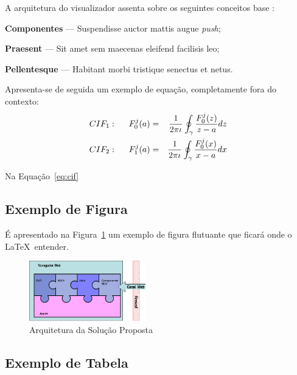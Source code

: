 \documentclass[twocolumn,twoside,11pt]{article}
\begin{document}
A arquitetura do visualizador assenta sobre os seguintes conceitos base \cite{kn:zpmd}:
\begin{compactitem}
\item \textbf{Componentes} --- Suspendisse auctor mattis augue \emph{push};
\item \textbf{Praesent} --- Sit amet sem maecenas eleifend facilisis leo;
\item \textbf{Pellentesque} --- Habitant morbi tristique senectus et netus.
\end{compactitem}

\lipsum[4]

Apresenta-se de seguida um exemplo de equação, completamente fora do contexto:
\begin{eqnarray}
CIF_1: \hspace*{5mm}F_0^j(a) &=& \frac{1}{2\pi \iota} \oint_{\gamma} \frac{F_0^j(z)}{z - a} dz\\
CIF_2: \hspace*{5mm}F_1^j(a) &=& \frac{1}{2\pi \iota} \oint_{\gamma} \frac{F_0^j(x)}{x - a} dx \label{eq:cif}
\end{eqnarray}

Na Equação~\ref{eq:cif} \lipsum[5]

\subsection{Exemplo de Figura}

É apresentado na Figura~\ref{fig:arch} %
um exemplo de figura flutuante que ficará onde o \LaTeX\ entender.

\begin{figure}
  \begin{center}
    \leavevmode
    \includegraphics[width=0.45\textwidth]{puzzle}
    \caption{Arquitetura da Solução Proposta}
    \label{fig:arch}
  \end{center}
\end{figure}

\lipsum[6]

\subsection{Exemplo de Tabela}
\end{document}
